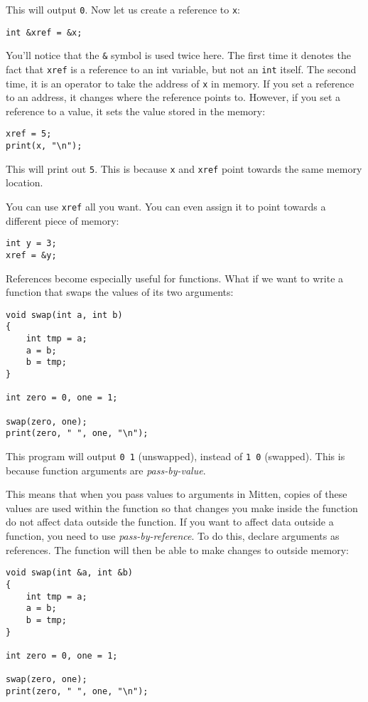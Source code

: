 \documentclass[10pt,a4paper]{article}
\begin{document}
This will output \verb|0|. Now let us create a reference to \verb|x|:
\begin{verbatim}
int &xref = &x;
\end{verbatim}

You'll notice that the \verb|&| symbol is used twice here. The first time it denotes the fact that \verb|xref| is a reference to an int variable, but not an \verb|int| itself. The second time, it is an operator to take the address of \verb|x| in memory. If you set a reference to an address, it changes where the reference points to. However, if you set a reference to a value, it sets the value stored in the memory:
\begin{verbatim}
xref = 5;
print(x, "\n");
\end{verbatim}

This will print out \verb|5|. This is because \verb|x| and \verb|xref| point towards the same memory location.

You can use \verb|xref| all you want. You can even assign it to point towards a different piece of memory:
\begin{verbatim}
int y = 3;
xref = &y;
\end{verbatim}

References become especially useful for functions. What if we want to write a function that swaps the values of its two arguments:
\begin{verbatim}
void swap(int a, int b)
{
    int tmp = a;
    a = b;
    b = tmp;
}

int zero = 0, one = 1;

swap(zero, one);
print(zero, " ", one, "\n");
\end{verbatim}

This program will output \verb|0 1| (unswapped), instead of \verb|1 0| (swapped). This is because function arguments are \textit{pass-by-value}.

This means that when you pass values to arguments in Mitten, copies of these values are used within the function so that changes you make inside the function do not affect data outside the function. If you want to affect data outside a function, you need to use \textit{pass-by-reference}. To do this, declare arguments as references. The function will then be able to make changes to outside memory:
\begin{verbatim}
void swap(int &a, int &b)
{
    int tmp = a;
    a = b;
    b = tmp;
}

int zero = 0, one = 1;

swap(zero, one);
print(zero, " ", one, "\n");
\end{verbatim}
\end{document}
